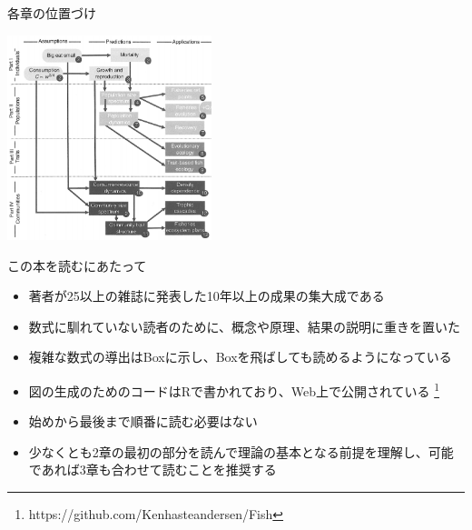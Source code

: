 \documentclass[
  ignorenonframetext,
]{beamer}
\providecommand{\tightlist}{%
  \setlength{\itemsep}{0pt}\setlength{\parskip}{0pt}}
\newcommand{\vspacesmall}{\vspace{3mm}}
\begin{document}
\begin{frame}{各章の位置づけ}
\protect\hypertarget{ux5404ux7ae0ux306eux4f4dux7f6eux3065ux3051}{}

\begin{center}\includegraphics[width=225px]{Fig2} \end{center}

\end{frame}

\begin{frame}{この本を読むにあたって}
\protect\hypertarget{ux3053ux306eux672cux3092ux8aadux3080ux306bux3042ux305fux3063ux3066}{}

\begin{itemize}
\tightlist
\item
  著者が25以上の雑誌に発表した10年以上の成果の集大成である\\
  \vspacesmall
\item
  数式に馴れていない読者のために、概念や原理、結果の説明に重きを置いた\\
  \vspacesmall
\item
  複雑な数式の導出はBoxに示し、Boxを飛ばしても読めるようになっている\\
  \vspacesmall
\item
  図の生成のためのコードはRで書かれており、Web上で公開されている
  \footnote[frame]{https://github.com/Kenhasteandersen/Fish}\\
  \vspacesmall
\item
  始めから最後まで順番に読む必要はない\\
  \vspacesmall
\item
  少なくとも2章の最初の部分を読んで理論の基本となる前提を理解し、可能であれば3章も合わせて読むことを推奨する
\end{itemize}

\end{frame}
\end{document}
